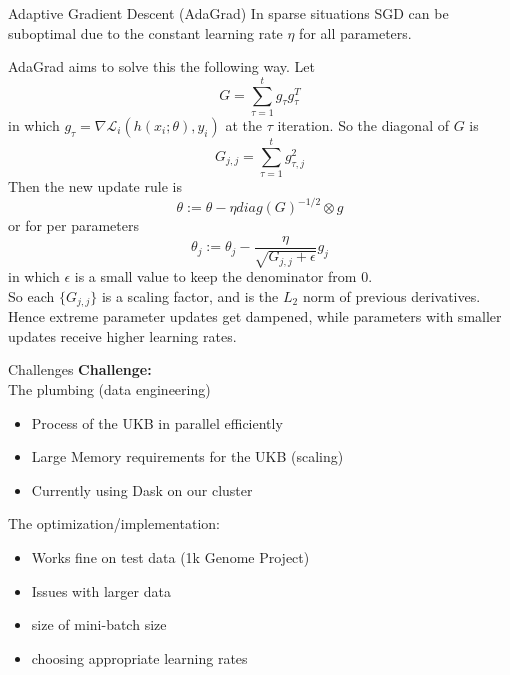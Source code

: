 \documentclass{beamer}
\begin{document}
\begin{frame}[t]{Adaptive Gradient Descent (AdaGrad)}
  \tiny
  In sparse situations SGD can be suboptimal due to the constant learning rate $\eta$ for all parameters.

  AdaGrad aims to solve this the following way.
  Let 
  \begin{equation}
    G = \sum^t_{\tau=1} g_\tau g_\tau^T
  \end{equation}
  in which $g_\tau = \nabla \mathcal{L}_i(h(x_i; \theta), y_i)$ at the $\tau$ iteration.
  So the diagonal of $G$ is
  \begin{equation}
    G_{j,j} = \sum^t_{\tau=1} g^2_{\tau,j}
  \end{equation}
  Then the new update rule is
  \begin{equation}
    \theta := \theta - \eta diag(G)^{-1/2} \otimes g
  \end{equation}
  or for per parameters
  \begin{equation}
    \theta_j := \theta_j - \frac{\eta}{\sqrt{G_{j,j} + \epsilon}}g_j
  \end{equation}
  in which $\epsilon$ is a small value to keep the denominator from $0$.
  \\
  So each $\{G_{j,j}\}$ is a scaling factor, and is the $L_2$ norm of previous derivatives. 
  Hence extreme parameter updates get dampened, while parameters with smaller updates receive higher learning rates.
\end{frame}

\begin{frame}[t]{Challenges}
  \textbf{Challenge:} \\
  The plumbing (data engineering)
  \\
  \begin{itemize}
    \item Process of the UKB in parallel efficiently
    \item Large Memory requirements for the UKB (scaling)
    \item Currently using Dask on our cluster
  \end{itemize}
  The optimization/implementation:
  \begin{itemize}
    \item Works fine on test data (1k Genome Project)
    \item Issues with larger data
    \item size of mini-batch size
    \item choosing appropriate learning rates
  \end{itemize}
\end{frame}
\end{document}

